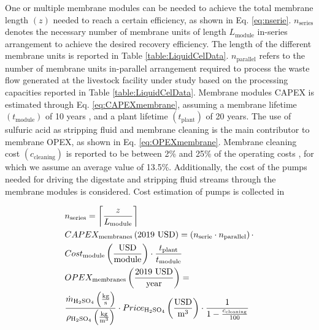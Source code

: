 \begin{refsection}[referencesCh6]

One or multiple membrane modules can be needed to achieve the total membrane length $\left( z \right)$ needed to reach a certain efficiency, as shown in Eq. \ref{eq:nserie}. $n_{\text{series}}$ denotes the necessary number of membrane units of length $L_{\text{module}}$ in-series arrangement to achieve the desired recovery efficiency. The length of the different membrane units is reported in Table \ref{table:LiquidCelData}. $n_{\text{parallel}}$ refers to the number of membrane units in-parallel arrangement required to process the waste flow generated at the livestock facility under study based on the processing capacities reported in Table \ref{table:LiquidCelData}. Membrane modules CAPEX is estimated through Eq. \ref{eq:CAPEXmembrane}, assuming a membrane lifetime $\left(t_{\text{module}}\right)$ of 10 years \citep{verrecht2010cost}, and a plant lifetime $\left(t_{\text{plant}}\right)$ of 20 years. The use of sulfuric acid as stripping fluid and membrane cleaning is the main contributor to membrane OPEX, as shown in Eq. \ref{eq:OPEXmembrane}. Membrane cleaning cost $\left(c_{\text{cleaning}}\right)$ is reported to be between 2\% and 25\% of the operating costs \citep{yu2020performance, verrecht2010cost}, for which we assume an average value of 13.5\%. 
Additionally, the cost of the pumps needed for driving the digestate and stripping fluid streams through the membrane modules is considered. Cost estimation of pumps is collected in {}

\begin{align}
	& n_{\text{series}} = \ceil*{\frac{z}{L_{\text{module}}}} \label{eq:nserie}
	\\
	& CAPEX_{\text{membranes}} \left(\text{2019 USD}\right)= \left(n_{\text{serie}} \cdot n_{\text{parallel}}\right) \cdot \nonumber \\
	& Cost_{\text{module}} \left(\frac{\text{USD}}{\text{module}}\right) \cdot \frac{t_{\text{plant}}}{t_{\text{module}}} \label{eq:CAPEXmembrane}
	\\
	& OPEX_{\text{membranes}} \left(\frac{\text{2019 USD}}{\text{year}}\right) = \nonumber \\
	& \frac{\dot{m}_{\text{H}_2 \text{SO}_4} \left(\frac{\text{kg}}{\text{s}}\right)}{\rho_{\text{H}_2 \text{SO}_4} \left(\frac{\text{kg}}{\text{m}^3}\right)} \cdot Price_{\text{H}_2 \text{SO}_4} \left(\frac{\text{USD}}{\text{m}^3}\right) \cdot \frac{1}{1-\frac{c_{\text{cleaning}}}{100}} \label{eq:OPEXmembrane}
\end{align}


\end{refsection}
